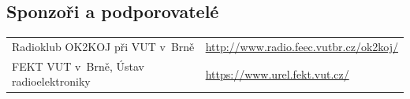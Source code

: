 \documentclass[a4paper,12pt]{article}
\begin{document}
\subsection{Sponzoři a podporovatelé}
\begin{tabular}{@{}ll@{}}

    Radioklub OK2KOJ při VUT v~Brně
        & \href{http://www.radio.feec.vutbr.cz/ok2koj/}{http://www.radio.feec.vutbr.cz/ok2koj/} \\

    FEKT VUT v~Brně, Ústav radioelektroniky
        & \href{https://www.urel.fekt.vut.cz/}{https://www.urel.fekt.vut.cz/} \\

\end{tabular}
\end{document}
